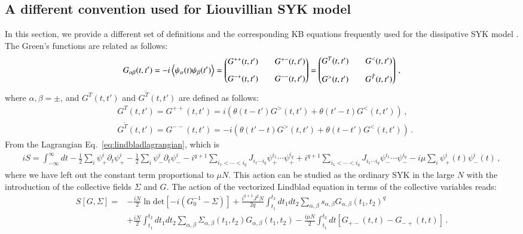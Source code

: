\subsection{A different convention used for Liouvillian SYK model}
In this section, we provide a different set of definitions and the corresponding KB equations frequently used for the dissipative SYK model \cite{kulkarni2022lindbladian,kawabata2023dynamical}. The Green's functions are related as follows:
\begin{align}
G_{\alpha\beta}(t,t')=-i\left<\psi_\alpha(t)\psi_\beta(t')\right>=\begin{pmatrix}
G^{++}(t,t')&&G^{+-}(t,t')\vspace{3mm}\\ 
G^{-+}(t,t')&&G^{--}(t,t')
\end{pmatrix}=
\begin{pmatrix}
G^{T}(t,t')&&G^{<}(t,t')\vspace{3mm}\\ 
G^{>}(t,t')&&G^{\tilde{T}}(t,t')
\end{pmatrix}\,,
\end{align}
where $\alpha,\beta=\pm$, and $G^{T}(t,t')$ and $G^{\tilde{T}}(t,t')$ are defined as follows:
\begin{align}
    &G^{T}(t,t')=G^{++}(t,t')=i\left(\theta(t-t')G^{>}(t,t')+\theta(t'-t)G^{<}(t,t')\right)\,,\\
    &G^{\tilde{T}}(t,t')=G^{--}(t,t')=-i\left(\theta(t'-t)G^{>}(t,t')+\theta(t-t')G^{<}(t,t')\right)\,.
\end{align}
From the Lagrangian Eq.~\eqref{eq:lindbladlagrangian}, which is
\begin{align}
      iS=\int_{-\infty}^{\infty} dt -\frac{1}{2}\sum_i \psi^i_+ \partial_t \psi_+^i-\frac{1}{2}\sum_i \psi^i_- \partial_t \psi_-^i -i^{q+1} \sum_{i_1<\cdots <i_q}J_{i_1\cdots i_q} \psi^{i_1}_+\cdots \psi_+^{i_q} + i^{q+1} \sum_{i_1<\cdots<i_q}J_{i_1\cdots i_q}\psi^{i_1}_-\cdots \psi_-^{i_q}-i\mu \sum_i \psi_+^i(t) \psi_-^i(t)\,,
\end{align}
where we have left out the constant term proportional to $\mu N$. This action can be studied as the ordinary SYK in the large $N$ with the introduction of the collective fields $\Sigma$ and $G$. The action of the vectorized Lindblad equation in terms of the collective variables reads:
\begin{equation}
\begin{split}
     S[G,\Sigma]=&-\frac{iN}{2} \ln \mathrm{det}[-i(G_0^{-1}-\Sigma)]+\frac{i^{q+1}J^2N}{2q}\int_{t_1}^{t_2} dt_1dt_2 \sum_{\alpha,\beta}s_{\alpha,\beta}G_{\alpha,\beta}(t_1,t_2)^q\\
    &+\frac{iN}{2}\int_{t_1}^{t_2}dt_1dt_2\sum_{\alpha,\beta}\Sigma_{\alpha,\beta}(t_1,t_2)G_{\alpha,\beta}(t_1,t_2)-\frac{i\mu N}{2} \int_{t_1}^{t_2}dt [G_{+-}(t,t)-G_{-+}(t,t)]\,.
\end{split}
\end{equation}
